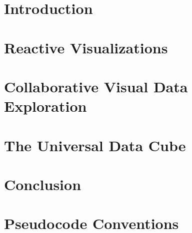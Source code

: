 \documentclass{umthesis}          %
\begin{document}


\tableofcontents                %
\listoftables                   %
\listoffigures                  %


\mainmatter   %

\chapter{Introduction}


\chapter{Reactive Visualizations}


\chapter{Collaborative Visual Data Exploration}


\chapter{The Universal Data Cube}


\chapter{Conclusion}


\appendix

\chapter{Pseudocode Conventions}

\end{document}
